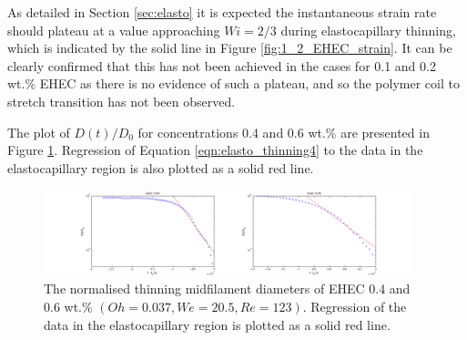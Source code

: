 \documentclass[11pt]{article}
\begin{document}
As detailed in Section \ref{sec:elasto} it is expected the instantaneous strain rate should plateau at a value approaching $Wi = 2/3$ during elastocapillary thinning, which is indicated by the solid line in Figure \ref{fig:1_2_EHEC_strain}. It can be clearly confirmed that this has not been achieved in the cases for 0.1 and 0.2 wt.\% EHEC as there is no evidence of such a plateau, and so the polymer coil to stretch transition has not been observed.

The plot of $D(t)/D_0$ for concentrations 0.4 and 0.6 wt.\% are presented in Figure \ref{fig:4_6_EHEC}. Regression of Equation \ref{eqn:elasto_thinning4} to the data in the elastocapillary region is also plotted as a solid red line.
\begin{figure}[H]
	\begin{center}
		\includegraphics[width=0.95\textwidth, trim = 7cm 0cm 6cm 0cm]{img/4_6_EHEC.png}
		\caption{The normalised thinning midfilament diameters of EHEC 0.4 and 0.6 wt.\% $ \left(Oh = 0.037 , We = 20.5, Re = 123 \right)$. Regression of the data in the elastocapillary region is plotted as a solid red line.}
		\label{fig:4_6_EHEC}
	\end{center}
\end{figure}
\end{document}
